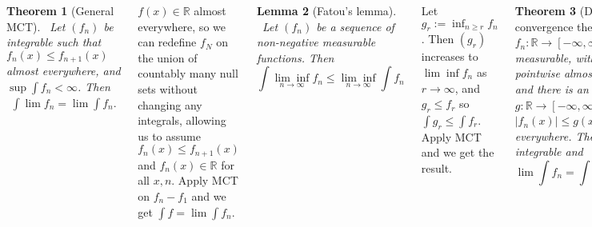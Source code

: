\documentclass{tikzposter} %
\newtheorem{theorem}{Theorem}
\newtheorem{lemma}[theorem]{Lemma}
\begin{document}
\begin{columns}
{    \begin{theorem}[General MCT]
      \ Let $(f_{n})$ be integrable such that $f_{n}(x) \le f_{n+1}(x)$ almost everywhere, and $\sup \int f_{n} < \infty$. Then
      \begin{align*}
        \int \lim f_{n} = \lim \int f_{n}.
      \end{align*}
    \end{theorem}
    \hphantom{}

    $f(x) \in \mathbb{R}$ almost everywhere, so we can redefine $f_{N}$ on the union of countably many null sets without changing any integrals, allowing us to assume $f_{n}(x) \le f_{n+1}(x)$ and $f_{n}(x) \in \mathbb{R}$ for all $x, n$. Apply MCT on $f_{n} - f_{1}$ and we get $\int f = \lim \int f_{n}$. \\

    \begin{lemma}[Fatou's lemma]
      \ Let $(f_{n})$ be a sequence of non-negative measurable functions. Then
      \[
        \int \underset{n \to \infty}{\lim \inf} f_{n} \le \underset{n \to \infty}{\lim \inf} \int f_{n}
      \]
    \end{lemma}
    \hphantom{}

    Let $g_{r} := \inf_{n \ge r} f_{n}$. Then $(g_{r})$ increases to $\lim\inf f_{n}$ as $r \to \infty$, and $g_{r} \le f_{r}$ so $\int g_{r} \le \int f_{r}$. Apply MCT and we get the result. \\

    \begin{theorem}[Dominated convergence theorem]
      \ Let $f_{n} : \mathbb{R} \to [-\infty, \infty]$ be measurable, with $f_{n} \to f$ pointwise almost everywhere, and there is an integrable $g : \mathbb{R} \to [-\infty, \infty]$ such that $|f_{n}(x)| \le g(x)$ almost everywhere. Then $f$ is integrable and
      \[
        \lim \int f_{n} = \int f = \int \lim f_{n}
      \]
    \end{theorem}
    \hphantom{}

    Proof by applying Fatou's lemma to $g + f_{n}$ and $g - f_{n}$ to obtain $\int (g+f) \le \int g + \lim \inf \int f_{n}$ and $\int (g - f) \le \int g - \lim\sup \int f_{n}$. \\

    \begin{theorem}[Bounded convergence theorem]
      \ Let $I$ be a bounded interval, $(f_{n})$ a sequence of integrable functions on $I$ converging almost everywhere to $f$, and suppose that there is a constant $c$ such that for all $n$, $|f_{n}(x)| \le c$ almost everywhere. Then $f$ is integrable on $I$, and
      \begin{align*}
        \lim \int_{I} f_{n} = \int_{I} f = \int \lim f_{n}.
      \end{align*}
    \end{theorem}
    \hphantom{}

}
\end{columns}
\end{document}
